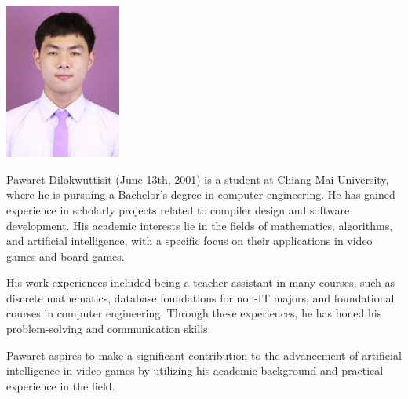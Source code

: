 \documentclass[final, project, english, glossary]{cpecmu}
\author{นายบางกอก วาณิชยานนท์}{Baangkok Vanijyananda}{630610746}
\author{นายปวเรศ ดิลกวุฒิสิทธิ์}{Pawaret Dilokwuttisit}{630610748}
\begin{document}
\ifglossary
  
\fi





\pagestyle{empty}\cleardoublepage
\normalspacing \setcounter{page}{1}  \pagestyle{cpecmu}





\ifproject

\fi



\ifproject
\normalspacing


\ifglossary\glossarypage\fi

\ifindex\indexpage\fi


\begin{biosketch}
\begin{center}
  \includegraphics[width=1.5in]{images/pawaret-mugshot.jpg}
\end{center}
Pawaret Dilokwuttisit (June 13th, 2001) is a student at Chiang Mai University, where he is pursuing a Bachelor's degree in computer engineering. He has gained experience in scholarly projects related to compiler design and software development. His academic interests lie in the fields of mathematics, algorithms, and artificial intelligence, with a specific focus on their applications in video games and board games.

His work experiences included being a teacher assistant in many courses, such as discrete mathematics, database foundations for non-IT majors, and foundational courses in computer engineering. Through these experiences, he has honed his problem-solving and communication skills.

Pawaret aspires to make a significant contribution to the advancement of artificial intelligence in video games by utilizing his academic background and practical experience in the field.

\end{biosketch}
\end{document}
